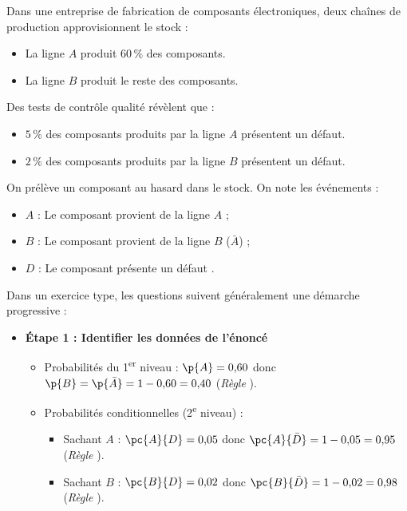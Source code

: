 \begin{methode}
	Dans une entreprise de fabrication de composants électroniques, deux chaînes de production approvisionnent le stock :
	\begin{itemize}
		\item La ligne $A$ produit $60\,\%$ des composants.
		\item La ligne $B$ produit le reste des composants.
	\end{itemize}

	Des tests de contrôle qualité révèlent que :
	\begin{itemize}
		\item $5\,\%$ des composants produits par la ligne $A$ présentent un défaut.
		\item $2\,\%$ des composants produits par la ligne $B$ présentent un défaut.
	\end{itemize}

	On prélève un composant au hasard dans le stock. On note les événements :
	\begin{itemize}
		\item $A$ : \og Le composant provient de la ligne $A$ \fg{} ;
		\item $B$ : \og Le composant provient de la ligne $B$ \fg{} ($\bar{A}$) ;
		\item $D$ : \og Le composant présente un défaut \fg{}.
	\end{itemize}

	\medskip

	Dans un exercice type, les questions suivent généralement une démarche progressive :
	\begin{itemize}
		\item \textbf{Étape 1 : Identifier les données de l'énoncé}
		      \begin{itemize}
			      \item Probabilités du 1\textsuperscript{er} niveau : $\p{A} = 0{,}60$ donc $\p{B} = \p{\bar{A}} = 1 - 0{,}60 = 0{,}40$ (\textit{Règle }).
			      \item Probabilités conditionnelles (2\textsuperscript{e} niveau) :
			            \begin{itemize}
				            \item Sachant $A$ : $\pc{A}{D} = 0{,}05$ donc $\pc{A}{\bar{D}} = 1 - 0{,}05 = 0{,}95$ (\textit{Règle }).
				            \item Sachant $B$ : $\pc{B}{D} = 0{,}02$ donc $\pc{B}{\bar{D}} = 1 - 0{,}02 = 0{,}98$ (\textit{Règle }).
			            \end{itemize}
		      \end{itemize}


\end{itemize}
\end{methode}
